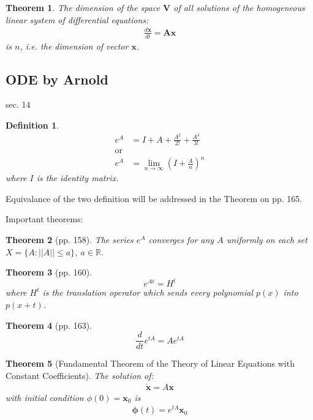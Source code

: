 \documentclass{article}
\numberwithin{equation}{subsection} %
\newtheorem{defi}{Definition}[section]
\newtheorem{thm}{Theorem}[section]
\theoremstyle{definition}
\begin{document}
    \begin{thm}
        The dimension of the space $\mathbf{V}$ of all solutions of the
        homogeneous linear system of differential equations:
        \begin{align}
            \frac{d\mathbf{x}}{dt}=\mathbf{Ax}
        \end{align}
        is $n$, i.e. the dimension of vector $\mathbf{x}$.
    \end{thm} 
    \subsection{ODE by Arnold}
    sec. 14
    \begin{defi}
        \begin{align}
            \label{eq:e^A}
            e^A &= I + A + \frac{A^2}{2!} + \frac{A^3}{3!}\\
            \text{or}& \nonumber \\
            e^A &= \lim_{n\to \infty}(I+\frac{A}{n})^n
        \end{align}
        where $I$ is the identity matrix.
    \end{defi}
    Equivalance of the two definition will be addressed in the Theorem on
    pp. 165.

    Important theorems:
    \begin{thm}[pp. 158]
        The series $e^A$ converges for any $A$ uniformly on each set
        $X=\{A:||A||\leq a\}$, $a\in \mathbb{R}$.
    \end{thm}
    \begin{thm}[pp. 160]
        $$e^{At} = H^t$$
        where $H^t$ is the translation operator which sends every polynomial
        $p(x)$ into $p(x+t)$.
    \end{thm}
    \begin{thm}[pp. 163]
        $$\frac{d}{dt} e^{tA} = Ae^{tA}$$
    \end{thm}
    \begin{thm}[Fundamental Theorem of the Theory of Linear Equations with
        Constant Coefficients]
        The solution of:
        \begin{align}
            \label{eq:fund_thm_of_linear_eqs_const_coef}
            \dot{\mathbf{x}} = A\mathbf{x}
        \end{align}
        with initial condition $\phi(0) = \mathbf{x}_0$ is
        \begin{align}
            \mathbf{\phi}(t) = e^{tA}\mathbf{x}_0
        \end{align}
    \end{thm}
    
\end{document}
